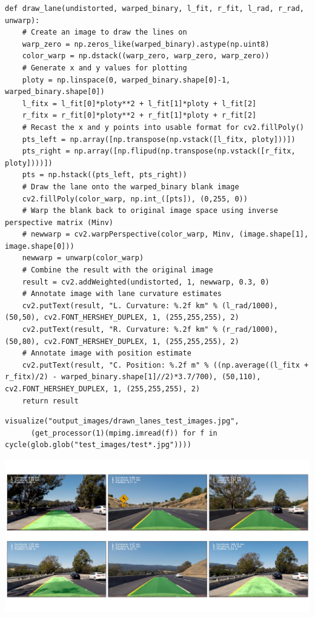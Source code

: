 \documentclass[11pt]{article}
\begin{document}
\begin{verbatim}
def draw_lane(undistorted, warped_binary, l_fit, r_fit, l_rad, r_rad, unwarp):
    # Create an image to draw the lines on
    warp_zero = np.zeros_like(warped_binary).astype(np.uint8)
    color_warp = np.dstack((warp_zero, warp_zero, warp_zero))
    # Generate x and y values for plotting
    ploty = np.linspace(0, warped_binary.shape[0]-1, warped_binary.shape[0])
    l_fitx = l_fit[0]*ploty**2 + l_fit[1]*ploty + l_fit[2]
    r_fitx = r_fit[0]*ploty**2 + r_fit[1]*ploty + r_fit[2]
    # Recast the x and y points into usable format for cv2.fillPoly()
    pts_left = np.array([np.transpose(np.vstack([l_fitx, ploty]))])
    pts_right = np.array([np.flipud(np.transpose(np.vstack([r_fitx, ploty])))])
    pts = np.hstack((pts_left, pts_right))
    # Draw the lane onto the warped_binary blank image
    cv2.fillPoly(color_warp, np.int_([pts]), (0,255, 0))
    # Warp the blank back to original image space using inverse perspective matrix (Minv)
    # newwarp = cv2.warpPerspective(color_warp, Minv, (image.shape[1], image.shape[0])) 
    newwarp = unwarp(color_warp)
    # Combine the result with the original image
    result = cv2.addWeighted(undistorted, 1, newwarp, 0.3, 0)
    # Annotate image with lane curvature estimates
    cv2.putText(result, "L. Curvature: %.2f km" % (l_rad/1000), (50,50), cv2.FONT_HERSHEY_DUPLEX, 1, (255,255,255), 2)
    cv2.putText(result, "R. Curvature: %.2f km" % (r_rad/1000), (50,80), cv2.FONT_HERSHEY_DUPLEX, 1, (255,255,255), 2)
    # Annotate image with position estimate
    cv2.putText(result, "C. Position: %.2f m" % ((np.average((l_fitx + r_fitx)/2) - warped_binary.shape[1]//2)*3.7/700), (50,110), cv2.FONT_HERSHEY_DUPLEX, 1, (255,255,255), 2)
    return result
\end{verbatim}

\begin{verbatim}
visualize("output_images/drawn_lanes_test_images.jpg", 
	  (get_processor(1)(mpimg.imread(f)) for f in cycle(glob.glob("test_images/test*.jpg"))))
\end{verbatim}

\includegraphics[width=.9\linewidth]{output_images/drawn_lanes_test_images.jpg}
\end{document}
